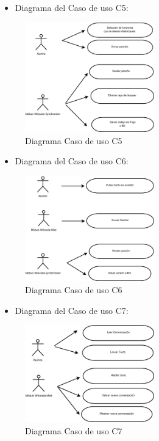 \vspace{1.5cm}

\begin{itemize}
	\item Diagrama del Caso de uso C5:
\end{itemize}

\begin{figure}[h]
	\centering
	\includegraphics[width=0.5\textwidth]{./img/c3-cu5.eps}
	\caption{Diagrama Caso de uso C5}
\end{figure}

\newpage

\begin{itemize}
	\item Diagrama del Caso de uso C6:
\end{itemize}

\begin{figure}[h]
	\centering
	\includegraphics[width=0.5\textwidth]{./img/c3-cu6.eps}
	\caption{Diagrama Caso de uso C6}
\end{figure}

\vspace{1.5cm}

\begin{itemize}
	\item Diagrama del Caso de uso C7:
\end{itemize}

\begin{figure}[h]
	\centering
	\includegraphics[width=0.5\textwidth]{./img/c3-cu7.eps}
	\caption{Diagrama Caso de uso C7}
\end{figure}

